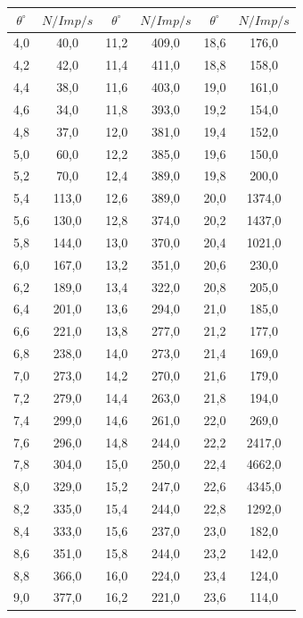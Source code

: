\begin{table}
  \centering
  \begin{tabular}{c c | c c | c c}
    \toprule
    $\theta^{\circ}$ & $N/Imp/s$ & $\theta^{\circ}$ & $N/Imp/s$ & $\theta^{\circ}$ & $N/Imp/s$ \\
    \midrule
     4,0 &  40,0 & 11,2 & 409,0 & 18,6 &  176,0 \\
     4,2 &  42,0 & 11,4 & 411,0 & 18,8 &  158,0 \\
     4,4 &  38,0 & 11,6 & 403,0 & 19,0 &  161,0 \\
     4,6 &  34,0 & 11,8 & 393,0 & 19,2 &  154,0 \\
     4,8 &  37,0 & 12,0 & 381,0 & 19,4 &  152,0 \\
     5,0 &  60,0 & 12,2 & 385,0 & 19,6 &  150,0 \\
     5,2 &  70,0 & 12,4 & 389,0 & 19,8 &  200,0 \\
     5,4 & 113,0 & 12,6 & 389,0 & 20,0 & 1374,0 \\
     5,6 & 130,0 & 12,8 & 374,0 & 20,2 & 1437,0 \\
     5,8 & 144,0 & 13,0 & 370,0 & 20,4 & 1021,0 \\
     6,0 & 167,0 & 13,2 & 351,0 & 20,6 &  230,0 \\
     6,2 & 189,0 & 13,4 & 322,0 & 20,8 &  205,0 \\
     6,4 & 201,0 & 13,6 & 294,0 & 21,0 &  185,0 \\
     6,6 & 221,0 & 13,8 & 277,0 & 21,2 &  177,0 \\
     6,8 & 238,0 & 14,0 & 273,0 & 21,4 &  169,0 \\
     7,0 & 273,0 & 14,2 & 270,0 & 21,6 &  179,0 \\
     7,2 & 279,0 & 14,4 & 263,0 & 21,8 &  194,0 \\
     7,4 & 299,0 & 14,6 & 261,0 & 22,0 &  269,0 \\
     7,6 & 296,0 & 14,8 & 244,0 & 22,2 & 2417,0 \\
     7,8 & 304,0 & 15,0 & 250,0 & 22,4 & 4662,0 \\
     8,0 & 329,0 & 15,2 & 247,0 & 22,6 & 4345,0 \\
     8,2 & 335,0 & 15,4 & 244,0 & 22,8 & 1292,0 \\
     8,4 & 333,0 & 15,6 & 237,0 & 23,0 &  182,0 \\
     8,6 & 351,0 & 15,8 & 244,0 & 23,2 &  142,0 \\
     8,8 & 366,0 & 16,0 & 224,0 & 23,4 &  124,0 \\
     9,0 & 377,0 & 16,2 & 221,0 & 23,6 &  114,0 \\

\end{tabular}
\end{table}
